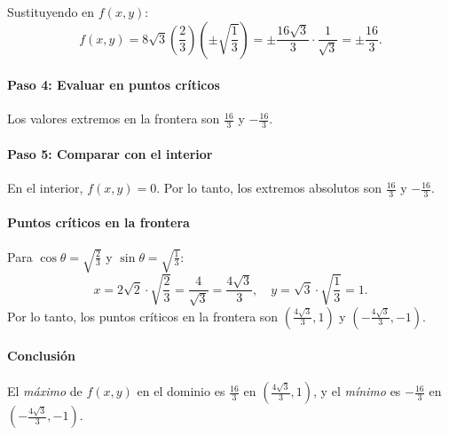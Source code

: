 \documentclass[11pt]{book}
\newcounter{cuent}
\theoremstyle{definicion}
\theoremstyle{teorema}
\theoremstyle{ejemplo}
\begin{document}
Sustituyendo en \( f(x, y) \):
\[
f(x, y) = 8\sqrt{3} \left( \frac{2}{3} \right) \left( \pm \sqrt{\frac{1}{3}} \right) = \pm \frac{16\sqrt{3}}{3} \cdot \frac{1}{\sqrt{3}} = \pm \frac{16}{3}.
\]

\paragraph*{Paso 4: Evaluar en puntos críticos}

Los valores extremos en la frontera son \( \frac{16}{3} \) y \( -\frac{16}{3} \).

\paragraph*{Paso 5: Comparar con el interior}

En el interior, \( f(x, y) = 0 \). Por lo tanto, los extremos absolutos son \( \frac{16}{3} \) y \( -\frac{16}{3} \).

\paragraph*{Puntos críticos en la frontera}

Para \( \cos \theta = \sqrt{\frac{2}{3}} \) y \( \sin \theta = \sqrt{\frac{1}{3}} \):
\[
x = 2\sqrt{2} \cdot \sqrt{\frac{2}{3}} = \frac{4}{\sqrt{3}} = \frac{4\sqrt{3}}{3}, \quad y = \sqrt{3} \cdot \sqrt{\frac{1}{3}} = 1.
\]
Por lo tanto, los puntos críticos en la frontera son \( \left( \frac{4\sqrt{3}}{3}, 1 \right) \) y \( \left( -\frac{4\sqrt{3}}{3}, -1 \right) \).

\paragraph*{Conclusión}

El \emph{máximo} de \( f(x, y) \) en el dominio es \( \frac{16}{3} \) en \( \left( \frac{4\sqrt{3}}{3}, 1 \right) \), y el \emph{mínimo} es \( -\frac{16}{3} \) en \( \left( -\frac{4\sqrt{3}}{3}, -1 \right) \).



\newpage
\end{document}
